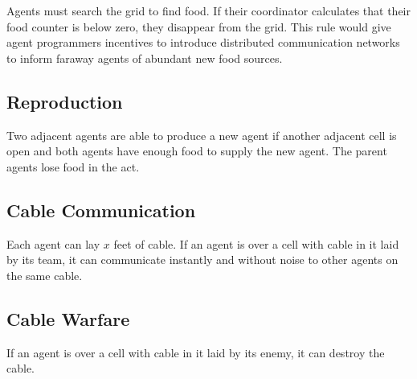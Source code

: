 Agents must search the grid to find food. If their coordinator calculates that their food counter is below zero, they disappear from the grid. This rule would give agent programmers incentives to introduce distributed communication networks to inform faraway agents of abundant new food sources.

\subsection{Reproduction}

Two adjacent agents are able to produce a new agent if another adjacent cell is open and both agents have enough food to supply the new agent. The parent agents lose food in the act.

\subsection{Cable Communication}

Each agent can lay $x$ feet of cable. If an agent is over a cell with cable in it laid by its team, it can communicate instantly and without noise to other agents on the same cable.

\subsection{Cable Warfare}

If an agent is over a cell with cable in it laid by its enemy, it can destroy the cable.
